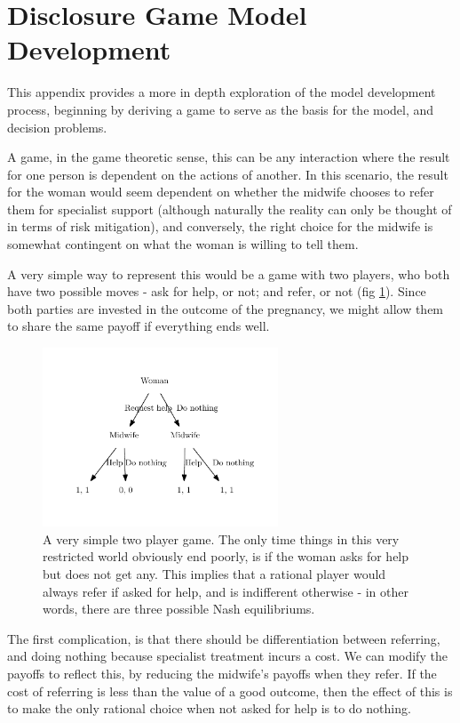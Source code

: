 \section{Disclosure Game Model Development}
\label{app:model_description}

This appendix provides a more in depth exploration of the model development process, beginning by deriving a game to serve as the basis for the model, and decision problems.

A game, in the game theoretic sense, this can be any interaction where the result for one person is dependent on the actions of another. In this scenario, the result for the woman would seem dependent on whether the midwife chooses to refer them for specialist support (although naturally the reality can only be thought of in terms of risk mitigation), and conversely, the right choice for the midwife is somewhat contingent on what the woman is willing to tell them.

A very simple way to represent this would be a game with two players, who both have two possible moves - ask for help, or not; and refer, or not (fig \ref{fig:simplest_game}). Since both parties are invested in the outcome of the pregnancy, we might allow them to share the same payoff if everything ends well.


\begin{figure}[H]
\sidecaption
\includegraphics[width=7cm]{figures/simplest_game}
\caption{A very simple two player game. The only time things in this very restricted world obviously end poorly, is if the woman asks for help but does not get any. This implies that a rational player would always refer if asked for help, and is indifferent otherwise - in other words, there are three possible Nash equilibriums.}
\label{fig:simplest_game}
\end{figure}

The first complication, is that there should be differentiation between referring, and doing nothing because specialist treatment incurs a cost. We can modify the payoffs to reflect this, by reducing the midwife's payoffs when they refer. If the cost of referring is less than the value of a good outcome, then the effect of this is to make the only rational choice when not asked for help is to do nothing.

